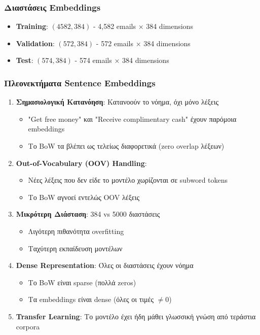 \documentclass[12pt,a4paper,twoside]{book}
\begin{document}
\subsubsection*{Διαστάσεις Embeddings}

\begin{itemize}
    \item \textbf{Training}: \((4582, 384)\) - 4,582 emails × 384 dimensions
    \item \textbf{Validation}: \((572, 384)\) - 572 emails × 384 dimensions
    \item \textbf{Test}: \((574, 384)\) - 574 emails × 384 dimensions
\end{itemize}

\subsubsection*{Πλεονεκτήματα Sentence Embeddings}

\begin{enumerate}
    \item \textbf{Σημασιολογική Κατανόηση}: Κατανοούν το νόημα, όχι μόνο λέξεις
          \begin{itemize}
              \item "Get free money" και "Receive complimentary cash" έχουν παρόμοια embeddings
              \item Το BoW τα βλέπει ως τελείως διαφορετικά (zero overlap λέξεων)
          \end{itemize}

    \item \textbf{Out-of-Vocabulary (OOV) Handling}:
          \begin{itemize}
              \item Νέες λέξεις που δεν είδε το μοντέλο χωρίζονται σε subword tokens
              \item Το BoW αγνοεί εντελώς OOV λέξεις
          \end{itemize}

    \item \textbf{Μικρότερη Διάσταση}: 384 vs 5000 διαστάσεις
          \begin{itemize}
              \item Λιγότερη πιθανότητα overfitting
              \item Ταχύτερη εκπαίδευση μοντέλων
          \end{itemize}

    \item \textbf{Dense Representation}: Όλες οι διαστάσεις έχουν νόημα
          \begin{itemize}
              \item Το BoW είναι sparse (πολλά zeros)
              \item Τα embeddings είναι dense (όλες οι τιμές \(\neq 0\))
          \end{itemize}

    \item \textbf{Transfer Learning}: Το μοντέλο έχει ήδη μάθει γλωσσική γνώση από τεράστια corpora
\end{enumerate}
\end{document}
